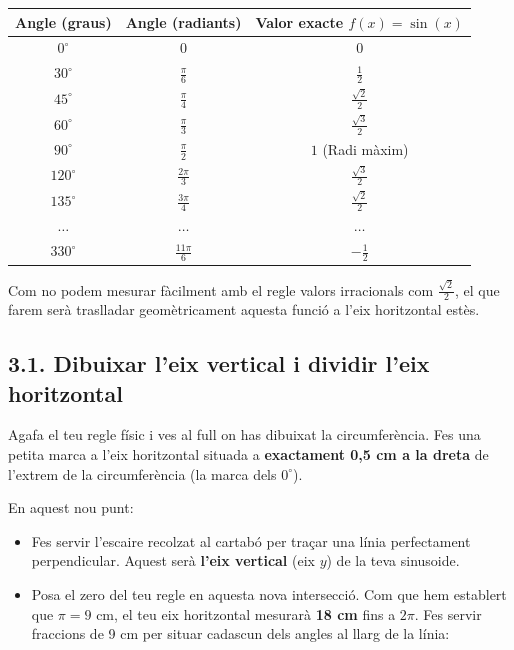 \documentclass[12pt,a4paper]{article}
\begin{document}
\vspace{0.3cm}
\begin{center}
\renewcommand{\arraystretch}{2}
\begin{tabular}{|c|c|c|}
\hline
\textbf{Angle (graus)} & \textbf{Angle (radiants)} & \textbf{Valor exacte $f(x) = \sin(x)$} \\ \hline
$0^\circ$ & $0$ & $0$ \\ \hline
$30^\circ$ & $\frac{\pi}{6}$ & $\frac{1}{2}$ \\ \hline
$45^\circ$ & $\frac{\pi}{4}$ & $\frac{\sqrt{2}}{2}$ \\ \hline
$60^\circ$ & $\frac{\pi}{3}$ & $\frac{\sqrt{3}}{2}$ \\ \hline
$90^\circ$ & $\frac{\pi}{2}$ & $1$ (Radi màxim) \\ \hline
$120^\circ$ & $\frac{2\pi}{3}$ & $\frac{\sqrt{3}}{2}$ \\ \hline
$135^\circ$ & $\frac{3\pi}{4}$ & $\frac{\sqrt{2}}{2}$ \\ \hline
$\dots$ & $\dots$ & $\dots$ \\ \hline
$330^\circ$ & $\frac{11\pi}{6}$ & $-\frac{1}{2}$ \\ \hline
\end{tabular}
\end{center}
\vspace{0.3cm}

Com no podem mesurar fàcilment amb el regle valors irracionals com $\frac{\sqrt{2}}{2}$, el que farem serà traslladar geomètricament aquesta funció a l'eix horitzontal estès.

\subsection*{3.1. Dibuixar l'eix vertical i dividir l'eix horitzontal}
Agafa el teu regle físic i ves al full on has dibuixat la circumferència. Fes una petita marca a l'eix horitzontal situada a \textbf{exactament 0,5 cm a la dreta} de l'extrem de la circumferència (la marca dels $0^\circ$).

En aquest nou punt:
\begin{itemize}[noitemsep]
    \item Fes servir l'escaire recolzat al cartabó per traçar una línia perfectament perpendicular. Aquest serà \textbf{l'eix vertical} (eix $y$) de la teva sinusoide.
    \item Posa el zero del teu regle en aquesta nova intersecció. Com que hem establert que $\pi = 9\text{ cm}$, el teu eix horitzontal mesurarà \textbf{18 cm} fins a $2\pi$. Fes servir fraccions de 9 cm per situar cadascun dels angles al llarg de la línia:
\end{itemize}
\end{document}
